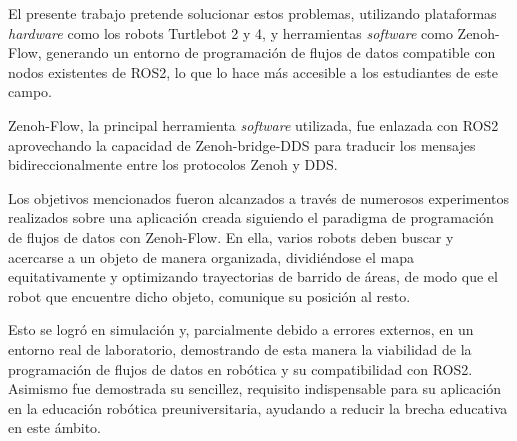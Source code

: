 El presente trabajo pretende solucionar estos problemas, utilizando plataformas
\textit{hardware} como los robots Turtlebot 2 y 4, y herramientas
\textit{software} como Zenoh-Flow, generando un entorno de programación de
flujos de datos compatible con nodos existentes de ROS2, lo que lo hace más
accesible a los estudiantes de este campo.

Zenoh-Flow, la principal herramienta \textit{software} utilizada, fue enlazada
con ROS2 aprovechando la capacidad de Zenoh-bridge-DDS para traducir los
mensajes bidireccionalmente entre los protocolos Zenoh y DDS.

Los objetivos mencionados fueron alcanzados a través de numerosos experimentos
realizados sobre una aplicación creada siguiendo el paradigma de programación de
flujos de datos con Zenoh-Flow.
En ella, varios robots deben buscar y acercarse a un objeto de manera
organizada, dividiéndose el mapa equitativamente y optimizando trayectorias de
barrido de áreas, de modo que el robot que encuentre dicho objeto, comunique su
posición al resto.

Esto se logró en simulación y, parcialmente debido a errores externos, en un
entorno real de laboratorio, demostrando de esta manera la viabilidad de la
programación de flujos de datos en robótica y su compatibilidad con ROS2.
Asimismo fue demostrada su sencillez, requisito indispensable para su aplicación
en la educación robótica preuniversitaria, ayudando a reducir la brecha
educativa en este ámbito.

